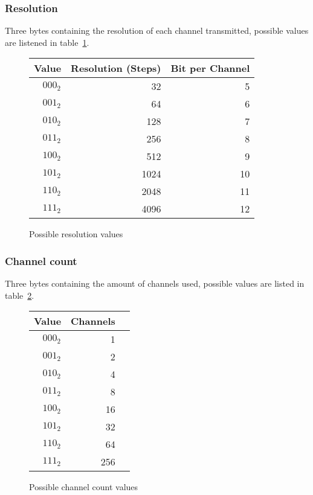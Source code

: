 \documentclass{report}
\begin{document}
    \subsubsection{Resolution}
     Three bytes containing the resolution of each channel transmitted, possible
     values are listened in table~\ref{fig:resValues}.
     \begin{figure}
         \centering
         \begin{tabular}{rrr}
           \toprule
           Value & Resolution (Steps) &	Bit per Channel \\
           \midrule
           $000_2$ & 32 & 5 \\
           $001_2$ & 64 & 6 \\
           $010_2$ & 128 & 7 \\
           $011_2$ & 256 & 8 \\
           $100_2$ & 512 & 9 \\
           $101_2$ & 1024 & 10 \\
           $110_2$ & 2048 & 11\\
           $111_2$ & 4096 & 12 \\
           \bottomrule
         \end{tabular}
         \caption{Possible resolution values}
         \label{fig:resValues}
     \end{figure}


    \subsubsection{Channel count}
     Three bytes containing the amount of channels used, possible values are
     listed in table~\ref{fig:channelValues}.

     \begin{figure}[H]
         \centering
         \begin{tabular}{rrr}
           \toprule
           Value & Channels \\
           \midrule
           $000_2$ & 1 \\
           $001_2$ & 2 \\
           $010_2$ & 4 \\
           $011_2$ & 8 \\
           $100_2$ & 16 \\
           $101_2$ & 32 \\
           $110_2$ & 64 \\
           $111_2$ & 256 \\
           \bottomrule
         \end{tabular}
         \caption{Possible channel count values}
         \label{fig:channelValues}
     \end{figure}
\end{document}
